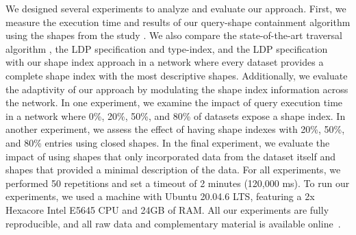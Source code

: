 We designed several experiments to analyze and evaluate our approach.
First, we measure the execution time and results of our query-shape containment algorithm using the shapes from the study .
We also compare the state-of-the-art traversal algorithm , the LDP specification and type-index, and the LDP specification~\cite{Taelman2023} with our shape index approach in a network where every dataset provides a complete shape index with the most descriptive shapes.
Additionally, we evaluate the adaptivity of our approach by modulating the shape index information across the network.
In one experiment, we examine the impact of query execution time in a network where 0\%, 20\%, 50\%, and 80\% of datasets  expose a shape index.
In another experiment, we assess the effect of having shape indexes with 20\%, 50\%, and 80\% entries using closed shapes.
In the final experiment, we evaluate the impact of using shapes that only incorporated data from the dataset itself and shapes that provided a minimal description of the data.
For all experiments, we performed 50 repetitions and set a timeout of 2 minutes (120,000 ms).
To run our experiments, we used a machine with Ubuntu 20.04.6 LTS, featuring a 2x Hexacore Intel E5645 CPU and 24GB of RAM.
All our experiments are fully reproducible, and all raw data and complementary material is available online~.


